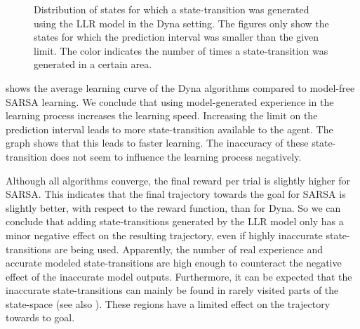 \begin{figure}[htbp]
{	\label{fig:PS-DYNA3_hLLR}
	}
	\caption[Inverted pendulum: Distribution of model-generated experience using Dyna]{Distribution of states for which a state-transition was generated using the \ac{LLR} model in the Dyna setting. The figures only show the states for which the prediction interval was smaller than the given limit. The color indicates the number of times a state-transition was generated in a certain area.}
	\label{fig:PS-DYNA_hLLR}
\end{figure}

 shows the average learning curve of the Dyna algorithms compared to model-free SARSA learning. We conclude that using model-generated experience in the learning process increases the learning speed. Increasing the limit on the prediction interval leads to more state-transition available to the agent. The graph shows that this leads to faster learning. The inaccuracy of these state-transition does not seem to influence the learning process negatively. 

Although all algorithms converge, the final reward per trial is slightly higher for SARSA. This indicates that the final trajectory towards the goal for SARSA is slightly better, with respect to the reward function, than for Dyna. So we can conclude that adding state-transitions generated by the \ac{LLR} model only has a minor negative effect on the resulting trajectory, even if highly inaccurate state-transitions are being used. Apparently, the number of real experience and accurate modeled state-transitions are high enough to counteract the negative effect of the inaccurate model outputs. Furthermore, it can be expected that the inaccurate state-transitions can mainly be found in rarely visited parts of the state-space (see also ). These regions have a limited effect on the trajectory towards to goal.


